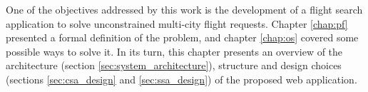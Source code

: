 One of the objectives addressed by this work is the development of a flight search application to solve unconstrained multi-city flight requests. Chapter \ref{chap:pf} presented a formal definition of the problem, and chapter \ref{chap:os} covered some possible ways to solve it. In its turn, this chapter presents an overview of the architecture (section \ref{sec:system_architecture}), structure and design choices (sections \ref{sec:csa_design} and \ref{sec:ssa_design}) of the proposed web application.